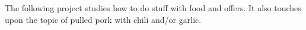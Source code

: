 
The following project studies how to do stuff with food and offers. It also touches upon the topic of pulled pork with chili and/or garlic.